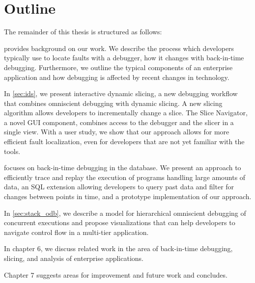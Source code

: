\section{Outline}

The remainder of this thesis is structured as follows:

 provides background on our work.
We describe the process which developers typically use to locate faults with a debugger, how it changes with back-in-time debugging.
Furthermore, we outline the typical components of an enterprise application and how debugging is affected by recent changes in technology.

In \cref{sec:ids}, we present interactive dynamic slicing, a new debugging workflow that combines omniscient debugging with dynamic slicing.
A new slicing algorithm allows developers to incrementally change a slice. 
The Slice Navigator, a novel GUI component, combines access to the debugger and the slicer in a single view.
With a user study, we show that our approach allows for more efficient fault localization, even for developers that are not yet familiar with the tools.

 focuses on back-in-time debugging in the database.
We present an approach to efficiently trace and replay the execution of programs handling large amounts of data,
an SQL extension allowing developers to query past data and filter for changes between points in time,
and a prototype implementation of our approach.

In \cref{sec:stack_odb}, we describe a model for hierarchical omniscient debugging of concurrent executions and propose visualizations that can help developers to navigate control flow in a multi-tier application.

In chapter 6, we discuss related work in the area of back-in-time debugging, slicing, and analysis of enterprise applications.

Chapter 7 suggests areas for improvement and future work and concludes.


